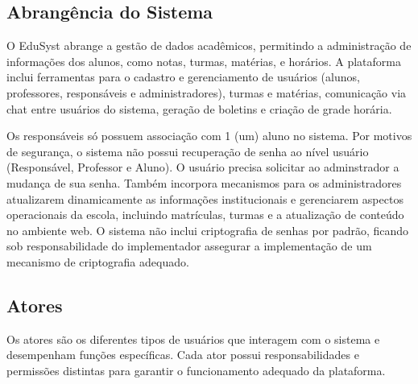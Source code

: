 \documentclass[main.tex]{subfiles}
\begin{document}
\subsection{Abrangência do Sistema}
O EduSyst abrange a gestão de dados acadêmicos, permitindo a administração de informações dos alunos, como notas, turmas, matérias, e horários.
A plataforma inclui ferramentas para o cadastro e gerenciamento de usuários (alunos, professores, responsáveis e administradores), turmas e matérias, comunicação via chat entre usuários do sistema, geração de boletins e criação de grade horária.

Os responsáveis só possuem associação com 1 (um) aluno no sistema. Por motivos de segurança, o sistema não possui recuperação de senha ao nível usuário (Responsável, Professor e Aluno). O usuário precisa solicitar ao adminstrador a mudança de sua senha. Também incorpora mecanismos para os administradores atualizarem dinamicamente as informações institucionais e gerenciarem aspectos operacionais da escola, incluindo matrículas, turmas e a atualização de conteúdo no ambiente web. O sistema não inclui criptografia de senhas por padrão, ficando sob responsabilidade do implementador assegurar a implementação de um mecanismo de criptografia adequado.


\subsection{Atores}
Os atores são os diferentes tipos de usuários que interagem com o sistema e desempenham funções específicas. Cada ator possui responsabilidades e permissões distintas para garantir o funcionamento adequado da plataforma.
\end{document}
